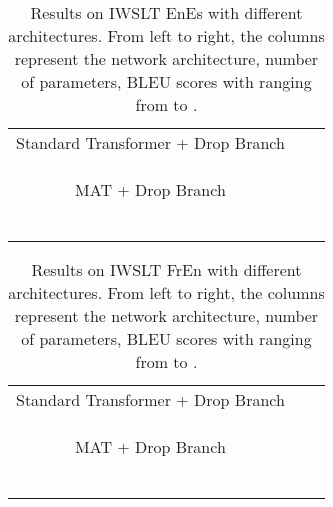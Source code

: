 \documentclass{article}
\begin{document}
\begin{table}[!htbp]
\centering
\small
\caption{Results on IWSLT EnEs with different architectures. From left to right, the columns represent the network architecture, number of parameters, BLEU scores with  ranging from  to .}
\begin{tabular}{lcccccc}
\toprule
 &   &  &  &   \\
\midrule
\multicolumn{5}{c}{Standard Transformer + Drop Branch} \\ 
\midrule
 &     &  &     &    \\
 &	 &	 &	 &	  \\
 &	 &	 &    &	  \\   \midrule
\multicolumn{5}{c}{MAT + Drop Branch} \\
\midrule
 &     &  &  &  \\
 &     &  &  &   \\
 &     &  &  &   \\
 &     &  &  &  \\
 & 	 &  &  &  \\
 & 	 &  &  &  \\
\bottomrule
\end{tabular}
\label{tab:iwslt_enes_multi-branch_attn}
\end{table}


\begin{table}[!htbp]
\centering
\small
\caption{Results on IWSLT FrEn with different architectures. From left to right, the columns represent the network architecture, number of parameters, BLEU scores with  ranging from  to .}
\begin{tabular}{lcccccc}
\toprule
 &   &  &  &   \\
\midrule
\multicolumn{5}{c}{Standard Transformer + Drop Branch} \\ 
\midrule
 &     &  &     &    \\
 &	 &	 &	 &	  \\
 &	 &	 &    &	  \\
\midrule
\multicolumn{5}{c}{MAT + Drop Branch} \\
\midrule
 &     &  &  &  \\
 &     &  &  &   \\
 &     &  &  &   \\
 &     &  &  &  \\
 & 	 &  &  &  \\
 & 	 &  &  &  \\
\bottomrule
\end{tabular}
\label{tab:iwslt_fren_multi-branch_attn}
\end{table}
\end{document}
